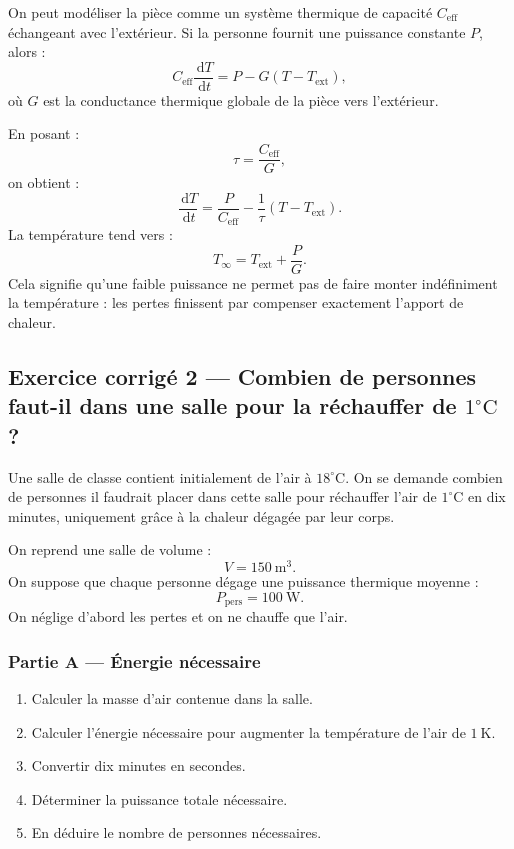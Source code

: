 \documentclass[11pt,a4paper]{article}
\newcommand{\dd}{\,\mathrm d}
\begin{document}
\begin{approfondissementbox}
On peut modéliser la pièce comme un système thermique de capacité \(C_{\mathrm{eff}}\) échangeant avec l'extérieur. Si la personne fournit une puissance constante \(P\), alors :
\[
C_{\mathrm{eff}}\frac{\dd T}{\dd t}=P-G(T-T_{\mathrm{ext}}),
\]
où \(G\) est la conductance thermique globale de la pièce vers l'extérieur.

En posant :
\[
\tau=\frac{C_{\mathrm{eff}}}{G},
\]
on obtient :
\[
\frac{\dd T}{\dd t}
=
\frac{P}{C_{\mathrm{eff}}}
-
\frac{1}{\tau}(T-T_{\mathrm{ext}}).
\]
La température tend vers :
\[
T_{\infty}=T_{\mathrm{ext}}+\frac{P}{G}.
\]
Cela signifie qu'une faible puissance ne permet pas de faire monter indéfiniment la température : les pertes finissent par compenser exactement l'apport de chaleur.
\end{approfondissementbox}

\subsection{Exercice corrigé 2 — Combien de personnes faut-il dans une salle pour la réchauffer de \(1^\circ\mathrm C\) ?}

\begin{exercicebox}
Une salle de classe contient initialement de l'air à \(18^\circ\mathrm C\). On se demande combien de personnes il faudrait placer dans cette salle pour réchauffer l'air de \(1^\circ\mathrm C\) en dix minutes, uniquement grâce à la chaleur dégagée par leur corps.

On reprend une salle de volume :
\[
V=150\ \mathrm{m^3}.
\]
On suppose que chaque personne dégage une puissance thermique moyenne :
\[
P_{\mathrm{pers}}=100\ \mathrm W.
\]
On néglige d'abord les pertes et on ne chauffe que l'air.
\end{exercicebox}

\subsubsection*{Partie A — Énergie nécessaire}

\begin{enumerate}
  \item Calculer la masse d'air contenue dans la salle.
  \item Calculer l'énergie nécessaire pour augmenter la température de l'air de \(1\ \mathrm K\).
  \item Convertir dix minutes en secondes.
  \item Déterminer la puissance totale nécessaire.
  \item En déduire le nombre de personnes nécessaires.
\end{enumerate}
\end{document}
